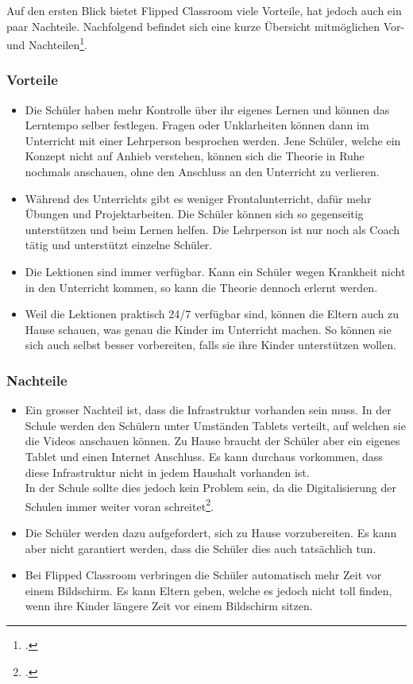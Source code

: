 \newpage

Auf den ersten Blick bietet Flipped Classroom viele Vorteile, hat jedoch auch ein paar Nachteile. Nachfolgend befindet sich eine kurze Übersicht mitmöglichen Vor- und Nachteilen\footcite{flipped_classroom_pro_con}.

\subsubsection*{Vorteile}
\begin{itemize}
	\item Die Schüler haben mehr Kontrolle über ihr eigenes Lernen und können das Lerntempo selber festlegen. Fragen oder Unklarheiten können dann im Unterricht mit einer Lehrperson besprochen werden. Jene Schüler, welche ein Konzept nicht auf Anhieb verstehen, können sich die Theorie in Ruhe nochmals anschauen, ohne den Anschluss an den Unterricht zu verlieren.
	\item Während des Unterrichts gibt es weniger Frontalunterricht, dafür mehr Übungen und Projektarbeiten. Die Schüler können sich so gegenseitig unterstützen und beim Lernen helfen. Die Lehrperson ist nur noch als Coach tätig und unterstützt einzelne Schüler.
	\item Die Lektionen sind immer verfügbar. Kann ein Schüler wegen Krankheit nicht in den Unterricht kommen, so kann die Theorie dennoch erlernt werden. 
	\item Weil die Lektionen praktisch 24/7 verfügbar sind, können die Eltern auch zu Hause schauen, was genau die Kinder im Unterricht machen. So können sie sich auch selbst besser vorbereiten, falls sie ihre Kinder unterstützen wollen. 
\end{itemize}

\subsubsection*{Nachteile}
\begin{itemize}
	\item Ein grosser Nachteil ist, dass die Infrastruktur vorhanden sein muss. In der Schule werden den Schülern unter Umständen Tablets verteilt, auf welchen sie die Videos anschauen können. Zu Hause braucht der Schüler aber ein eigenes Tablet und einen Internet Anschluss. Es kann durchaus vorkommen, dass diese Infrastruktur nicht in jedem Haushalt vorhanden ist. \\
	In der Schule sollte dies jedoch kein Problem sein, da die Digitalisierung der Schulen immer weiter voran schreitet\footcite{digitale_schule}.
	\item Die Schüler werden dazu aufgefordert, sich zu Hause vorzubereiten. Es kann aber nicht garantiert werden, dass die Schüler dies auch tatsächlich tun.
	\item Bei Flipped Classroom verbringen die Schüler automatisch mehr Zeit vor einem Bildschirm. Es kann Eltern geben, welche es jedoch nicht toll finden, wenn ihre Kinder längere Zeit vor einem Bildschirm sitzen.
\end{itemize}

